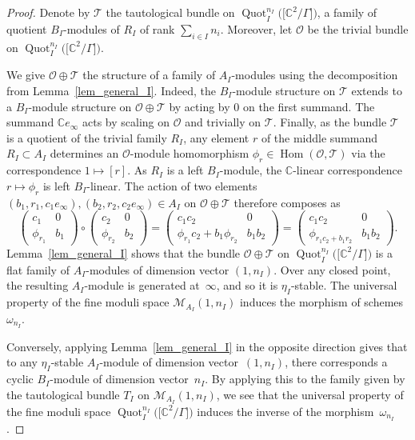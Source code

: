 \documentclass[10pt,a4paper]{amsart}
\newcommand{\SC}{\mathbb{C}} %
\newcommand{\Hom}{\operatorname{Hom}}
\newcommand{\PiGamma}{B}
\newcommand{\PiQ}{A}
\DeclareMathOperator{\Quot}{\mathrm{Quot}}
\newcommand{\QuotI}[1][ ]{\Quot_I^{#1}}
\newcommand{\QuotInI}{\QuotI[n_I]}
\numberwithin{equation}{section}
\begin{document}
\begin{proof}
Denote by $\mathcal{T}$ the tautological bundle on $\QuotInI\big(\big[\SC^2/\Gamma\big]\big)$, a family of quotient $\PiGamma_I$-modules of $R_I$ of rank $\sum_{i \in I} n_i$. Moreover, let $\mathcal{O}$ be the trivial bundle on $\QuotInI\big(\big[\SC^2/\Gamma\big]\big)$.

We give $\mathcal{O}\oplus \mathcal{T}$ the structure of a family of $\PiQ_I$-modules using the decomposition from Lemma~\ref{lem_general_I}.
Indeed, the $\PiGamma_I$-module structure on $\mathcal{T}$ extends to a $\PiGamma_I$-module structure on $\mathcal{O}\oplus \mathcal{T}$ by acting by $0$ on the first summand. The summand $\SC e_\infty$ acts by scaling on $\mathcal{O}$ and trivially on $\mathcal{T}$. Finally, as the bundle $\mathcal{T}$ is a quotient of the trivial family $R_I$, any element $r$ of the middle summand $R_I \subset A_I$ determines an $\mathcal{O}$-module homomorphism $\phi_r \in \Hom(\mathcal{O},\mathcal{T})$ via the correspondence $1\mapsto [r]$. As $R_I$ is a left $\PiGamma_I$-module, the $\SC$-linear correspondence $r \mapsto \phi_r$ is left $\PiGamma_I$-linear. The action of two elements $(b_1,r_1,c_1 e_\infty), (b_2,r_2,c_2 e_\infty) \in \PiQ_I$ on $\mathcal{O}\oplus \mathcal{T}$ therefore composes as
\[ \begin{pmatrix}c_1 & 0 \\ \phi_{r_1} & b_1 \end{pmatrix} \circ \begin{pmatrix}c_2 & 0 \\ \phi_{r_2} & b_2 \end{pmatrix} = \begin{pmatrix}c_1c_2 & 0 \\ \phi_{r_1}c_2+b_1\phi_{r_2} & b_1b_2 \end{pmatrix}=\begin{pmatrix}c_1c_2 & 0 \\ \phi_{r_1c_2+b_1r_2} & b_1b_2 \end{pmatrix}.\]
Lemma~\ref{lem_general_I}
shows that
the bundle $\mathcal{O}\oplus \mathcal{T}$ on $\QuotInI\big(\big[\SC^2/\Gamma\big]\big)$
is a flat family of $\PiQ_I$-modules
of dimension vector $(1,n_I)$. Over any closed point, the resulting
$\PiQ_I$-module is generated at~$\infty$, and so it is $\eta_I$-stable.
The universal property of the fine moduli space $\mathcal{M}_{\PiQ_I}(1,n_I)$
induces the morphism of schemes~$\omega_{n_I}$.

Conversely, applying Lemma~\ref{lem_general_I}
in the opposite direction gives that to any $\eta_I$-stable $\PiQ_I$-module of dimension vector~$(1,n_I)$, there corresponds a cyclic $\PiGamma_I$-module of dimension vector~$n_I$. By applying this to the family given by the tautological bundle $T_I$ on $\mathcal{M}_{\PiQ_I}(1,n_I)$, we see that the universal property of the fine moduli space $\QuotInI\big(\big[\SC^2/\Gamma\big]\big)$
induces the inverse of the mor\-phism~$\omega_{n_I}$.
\end{proof}
\end{document}
